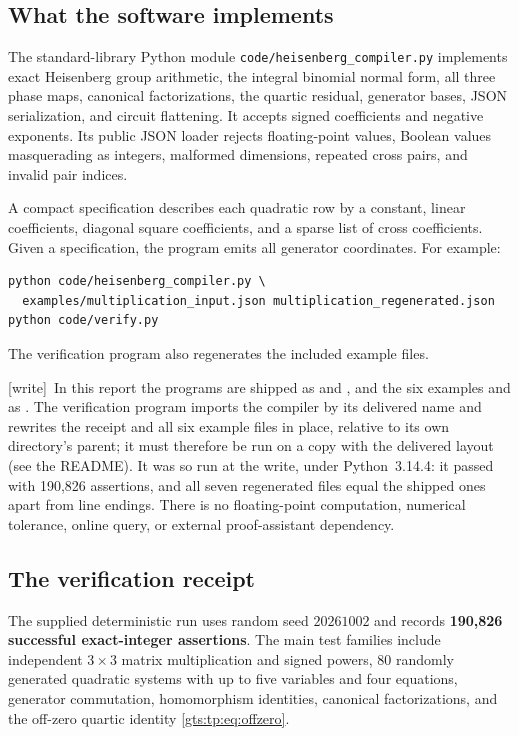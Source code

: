 \documentclass[11pt,letterpaper]{article}
\theoremstyle{definition}
\theoremstyle{remark}
\newcommand{\wtag}{\textup{[write]}}
\begin{document}
\subsection{What the software implements}
The standard-library Python module
\texttt{code/heisenberg\_compiler.py} implements exact Heisenberg group
arithmetic, the integral binomial normal form, all three phase maps,
canonical factorizations, the quartic residual, generator bases, JSON
serialization, and circuit flattening. It accepts signed coefficients and
negative exponents. Its public JSON loader rejects floating-point values,
Boolean values masquerading as integers, malformed dimensions, repeated
cross pairs, and invalid pair indices.

A compact specification describes each quadratic row by a constant,
linear coefficients, diagonal square coefficients, and a sparse list of
cross coefficients. Given a specification, the program emits all generator
coordinates. For example:
\begin{lstlisting}
python code/heisenberg_compiler.py \
  examples/multiplication_input.json multiplication_regenerated.json
python code/verify.py
\end{lstlisting}
The verification program also regenerates the included example files.

\wtag\ In this report the programs are shipped as  and , and the six examples and  as . The verification program imports the compiler by its delivered name and rewrites the receipt and all six example files in place, relative to its own directory's parent; it must therefore be run on a copy with the delivered layout (see the README). It was so run at the write, under Python~3.14.4: it passed with 190,826 assertions, and all seven regenerated files equal the shipped ones apart from line endings.
There is no floating-point computation, numerical tolerance, online query,
or external proof-assistant dependency.

\subsection{The verification receipt}
The supplied deterministic run uses random seed $20261002$ and records
\textbf{190,826 successful exact-integer assertions}. The main test families
include independent $3\times3$ matrix multiplication and signed powers,
80 randomly generated quadratic systems with up to five variables and
four equations, generator commutation, homomorphism identities, canonical
factorizations, and the off-zero quartic identity \eqref{gts:tp:eq:offzero}.
\end{document}
